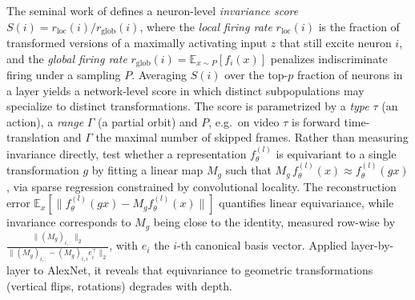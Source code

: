 \documentclass[mathematics,review,submit,moreauthors]{Definitions/mdpi}
\begin{document}
The seminal work of \citet{goodfellow2009anips} defines a neuron-level \emph{invariance score} $S(i) = r_{\mathrm{loc}}(i)/r_{\mathrm{glob}}(i)$, where the \emph{local firing rate} $r_{\mathrm{loc}}(i)$ is the fraction of transformed versions of a maximally activating input $z$ that still excite neuron $i$, and the \emph{global firing rate} $r_{\mathrm{glob}}(i) = \mathbb{E}_{x\sim P}[f_i(x)]$ penalizes indiscriminate firing under a sampling $P$.
Averaging $S(i)$ over the top-$p$ fraction of neurons in a layer yields a network-level score in which distinct subpopulations may specialize to distinct transformations.
The score is parametrized by a \emph{type} $\tau$ (an action), a \emph{range} $\Gamma$ (a partial orbit) and $P$, e.g.\ on video $\tau$ is forward time-translation and $\Gamma$ the maximal number of skipped frames.
Rather than measuring invariance directly, \citet{lenc2014a} test whether a representation $f_\theta^{(l)}$ is equivariant to a single transformation $g$ by fitting a linear map $M_g$ such that $M_g\,f_\theta^{(l)}(x) \approx f_\theta^{(l)}(gx)$, via sparse regression constrained by convolutional locality.
The reconstruction error $\mathbb{E}_x[\|f_\theta^{(l)}(gx)-M_g f_\theta^{(l)}(x)\|]$ quantifies linear equivariance, while invariance corresponds to $M_g$ being close to the identity, measured row-wise by $\frac{\|(M_g)_{i,:}\|_2}{\|(M_g)_{i,:}-(M_g)_{i,i}e_{i}^\top\|_2}$, with $e_{i}$ the $i$-th canonical basis vector.
Applied layer-by-layer to AlexNet, it reveals that equivariance to geometric transformations (vertical flips, rotations) degrades with depth.
\end{document}
